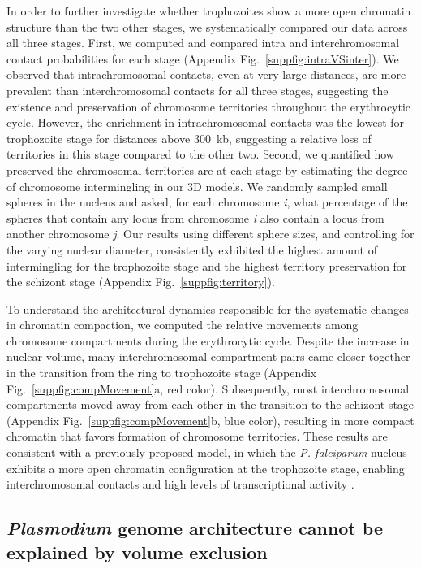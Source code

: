 In order to further investigate whether trophozoites show a more open
chromatin structure than the two other stages, we systematically compared our
data across all three stages. First, we computed and compared intra and
interchromosomal contact probabilities for each stage (Appendix
Fig.~\ref{suppfig:intraVSinter}). We observed that intrachromosomal contacts,
even at very large distances, are more prevalent than interchromosomal
contacts for all three stages, suggesting the existence and preservation of
chromosome territories throughout the erythrocytic cycle. However, the
enrichment in intrachromosomal contacts was the lowest for trophozoite stage
for distances above 300~kb, suggesting a relative loss of territories in this
stage compared to the other two. Second, we quantified how preserved the
chromosomal territories are at each stage by estimating the degree of
chromosome intermingling in our 3D models. We randomly sampled small spheres
in the nucleus and asked, for each chromosome {\em i}, what percentage of the
spheres that contain any locus from chromosome {\em i} also contain a locus
from another chromosome {\em j}. Our results using different sphere sizes, and
controlling for the varying nuclear diameter, consistently exhibited the
highest amount of intermingling for the trophozoite stage and the highest
territory preservation for the schizont stage (Appendix
Fig.~\ref{suppfig:territory}).

To understand the architectural dynamics responsible for the systematic
changes in chromatin compaction, we computed the relative movements among
chromosome compartments during the erythrocytic cycle. Despite the increase in
nuclear volume, many interchromosomal compartment pairs came closer together
in the transition from the ring to trophozoite stage (Appendix
Fig.~\ref{suppfig:compMovement}a, red color). Subsequently, most
interchromosomal compartments moved away from each other in the transition to
the schizont stage (Appendix Fig.~\ref{suppfig:compMovement}b, blue
color), resulting in more compact chromatin that favors formation of
chromosome territories. These results are consistent with a previously
proposed model, in which the {\em P. falciparum} nucleus exhibits a more open
chromatin configuration at the trophozoite stage, enabling interchromosomal
contacts and high levels of transcriptional activity \citep{ponts:nucleosome}.

\subsection{{\em Plasmodium} genome architecture cannot be explained by volume exclusion}

